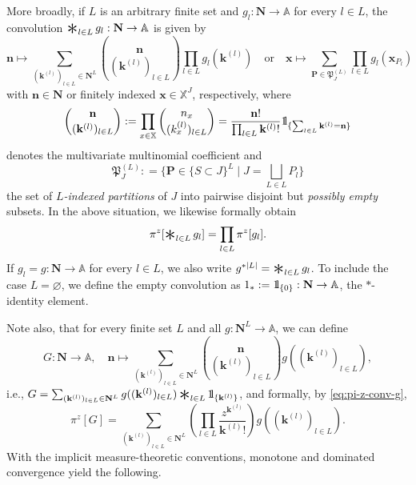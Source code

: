 \documentclass[10pt,a4paper]{amsart}
\newcommand{\X}{\mathbb X}
\newcommand{\A}{\mathbb A}
\newcommand{\be}{\begin{equation}}
\newcommand{\ee}{\end{equation}}
\newcommand{\Conv}{\mathop{\scalebox{2}{\raisebox{-0.275ex}{$\ast$}}}}
\def\1{{\mathchoice {1\mskip-4mu\mathrm l}      
{1\mskip-4mu\mathrm l}
{1\mskip-4.5mu\mathrm l} {1\mskip-5mu\mathrm l}}}
\begin{document}
More broadly, if $L$ is an arbitrary finite set and $g_l : \mathbf N \to \A$ for every $l \in L$, the convolution $\Conv_{l \in L} g_l : \mathbf N \to \A$ is given by
\[
	\mathbf n \mapsto \sum_{(\mathbf k^{(l)})_{l \in L} \in \mathbf N^L} \binom{\mathbf n}{(\mathbf k^{(l)})_{l \in L}} \prod_{l \in L} g_l(\mathbf k^{(l)}) \quad \text{or} \quad \mathbf x \mapsto \sum_{\mathbf P \in \mathfrak P_J^{(L)}} \prod_{l \in L} g_l(\mathbf x_{P_l})
\]
with $\mathbf n\in\mathbf N$ or finitely indexed $\mathbf x \in \X^J$, respectively, where
\begin{align*}
	\binom{\mathbf n}{(\mathbf k^{(l)})_{l \in L}} : = \prod_{x \in \X} \binom{n_x}{(k^{(l)}_x)_{l \in L}} = \frac{\mathbf n!}{\prod_{l \in L} \mathbf k^{(l)}!} \1_{\{\sum_{l \in L} \mathbf k^{(l)} = \mathbf n\}}
\end{align*}
denotes the multivariate multinomial coefficient and
\[
	\mathfrak P_J^{(L)} : = \{{\textstyle \mathbf P \in \{S \subset J\}^L \mid J = \bigsqcup_{L \in L} P_l}\}
\]
the set of \emph{$L$-indexed partitions} of $J$ into pairwise disjoint but \emph{possibly empty} subsets. 
In the above situation, we likewise formally obtain
\be \label{eq:pi-z-conv-g}
	\pi^z[{\textstyle \Conv_{l \in L} g_l}] = \prod_{l \in L} \pi^z[g_l].
\ee
If $g_l = g : \mathbf N \to \A$ for every $l \in L$, we also write $g^{\ast |L|} = \Conv_{l \in L} g_l$. 
To include the case $L = \varnothing$, we define the empty convolution as $1_\ast : = \1_{\{0\}} : \mathbf N \to \A$, the $\ast$-identity element.

Note also, that for every finite set $L$ and all $g : \mathbf N^L \to \A$, we can define
\be \label{eq:conv-g-generalised}
	G : \mathbf N \to \A, \quad \mathbf n \mapsto \sum_{(\mathbf k^{(l)})_{l \in L} \in \mathbf N^L} \binom{\mathbf n}{(\mathbf k^{(l)})_{l \in L}} g((\mathbf k^{(l)})_{l \in L}),
\ee
i.e., $G = \sum_{(\mathbf k^{(l)})_{l \in L} \in \mathbf N^L} g((\mathbf k^{(l)})_{l \in L}) \Conv_{l \in L} \1_{\{\mathbf k^{(l)}\}}$, and formally, by \eqref{eq:pi-z-conv-g},
\be \label{eq:pi-z-conv-g-generalised}
	\pi^z[G] = \sum_{(\mathbf k^{(l)})_{l \in L} \in \mathbf N^L} \left( \prod_{l \in L} \frac{z^{\mathbf k^{(l)}}}{\mathbf k^{(l)}!} \right) g((\mathbf k^{(l)})_{l \in L}).
\ee
With the implicit measure-theoretic conventions, monotone and dominated convergence yield the following.
\end{document}
